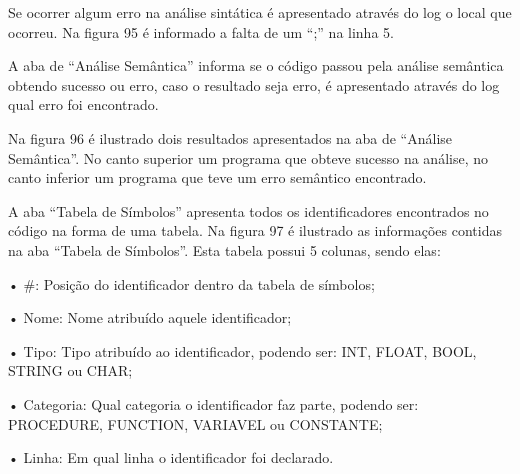 \documentclass[12pt,oneside,a4paper,chapter=TITLE,section=TITLE,sumario=tradicional]{abntex2}
\begin{document}
\begin{figure}[H]
\end{figure}

Se ocorrer algum erro na análise sintática é apresentado através do log o local que ocorreu. Na figura 95 é informado a falta de um “;” na linha 5.

\begin{figure}[H]
\end{figure}


A aba de “Análise Semântica” informa se o código passou pela análise semântica obtendo sucesso ou erro, caso o resultado seja erro, é apresentado através do log qual erro foi encontrado.

Na figura 96 é ilustrado dois resultados apresentados na aba de “Análise Semântica”. No canto superior um programa que obteve sucesso na análise, no canto inferior um programa que teve um erro semântico encontrado.

\begin{figure}[H]
\end{figure}

A aba “Tabela de Símbolos” apresenta todos os identificadores encontrados no código na forma de uma tabela. 
Na figura 97 é ilustrado as informações contidas na aba “Tabela de Símbolos”. Esta tabela possui 5 colunas, sendo elas:

•	\#: Posição do identificador dentro da tabela de símbolos;

•	Nome: Nome atribuído aquele identificador;

•	Tipo: Tipo atribuído ao identificador, podendo ser: INT, FLOAT, BOOL, STRING ou CHAR;

•	Categoria: Qual categoria o identificador faz parte, podendo ser: PROCEDURE, FUNCTION, VARIAVEL ou CONSTANTE;

•	Linha: Em qual linha o identificador foi declarado.

\begin{figure}[H]
\end{figure}
\end{document}
